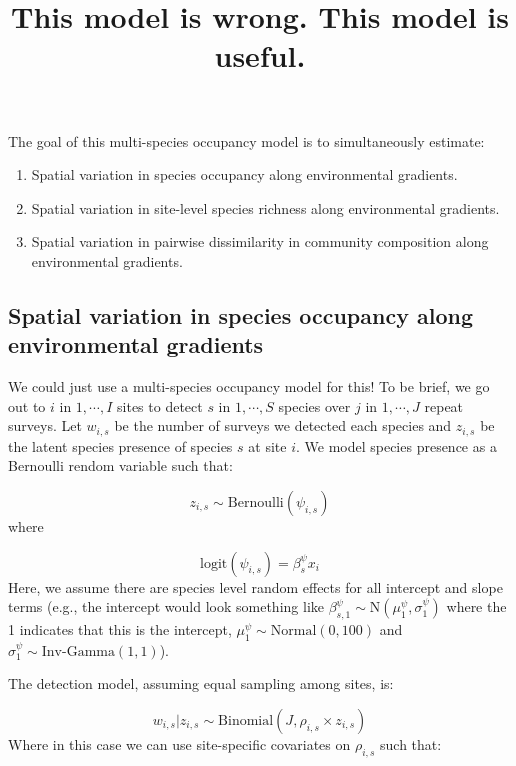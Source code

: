 \documentclass[
]{article}
\title{This model is wrong. This model is useful.}
\author{}
\date{\vspace{-2.5em}}
\providecommand{\tightlist}{%
  \setlength{\itemsep}{0pt}\setlength{\parskip}{0pt}}
\begin{document}
\maketitle

The goal of this multi-species occupancy model is to simultaneously
estimate:

\begin{enumerate}
\def\labelenumi{\arabic{enumi}.}
\tightlist
\item
  Spatial variation in species occupancy along environmental gradients.
\item
  Spatial variation in site-level species richness along environmental
  gradients.
\item
  Spatial variation in pairwise dissimilarity in community composition
  along environmental gradients.
\end{enumerate}

\hypertarget{spatial-variation-in-species-occupancy-along-environmental-gradients}{%
\subsection{Spatial variation in species occupancy along environmental
gradients}\label{spatial-variation-in-species-occupancy-along-environmental-gradients}}

We could just use a multi-species occupancy model for this! To be brief,
we go out to \(i\) in \(1, \cdots, I\) sites to detect \(s\) in
\(1, \cdots, S\) species over \(j\) in \(1, \cdots, J\) repeat surveys.
Let \(w_{i,s}\) be the number of surveys we detected each species and
\(z_{i,s}\) be the latent species presence of species \(s\) at site
\(i\). We model species presence as a Bernoulli rendom variable such
that:

\[z_{i,s} \sim \text{Bernoulli}(\psi_{i,s})\] where

\[\text{logit}(\psi_{i,s}) = \beta_s^{\psi} x_i\] Here, we assume there
are species level random effects for all intercept and slope terms
(e.g., the intercept would look something like
\(\beta_{s,1}^\psi \sim \text{N}(\mu_1^\psi, \sigma_1^\psi)\) where the
1 indicates that this is the intercept,
\(\mu_1^\psi \sim \text{Normal}(0, 100)\) and
\(\sigma_1^\psi \sim \text{Inv-Gamma}(1,1)\)).

The detection model, assuming equal sampling among sites, is:

\[w_{i,s}|z_{i,s} \sim \text{Binomial}(J, \rho_{i,s} \times z_{i,s} )\]
Where in this case we can use site-specific covariates on \(\rho_{i,s}\)
such that:
\end{document}
